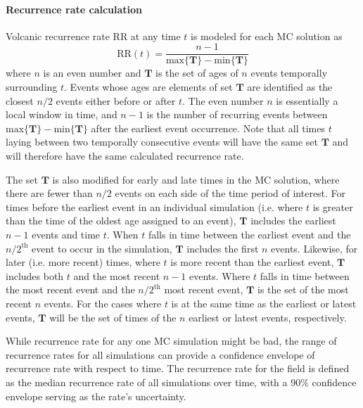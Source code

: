 \paragraph{Recurrence rate calculation} Volcanic recurrence rate RR at any time $t$ is modeled for each MC solution as
\begin{equation}
\text{RR}(t) = \frac{n-1}{\text{max}\{\mathbf{T}\} - \text{min}\{\mathbf{T}\}}
\label{eq_RR}
\end{equation}
where $n$ is an even number and $\mathbf{T}$ is the set of ages of $n$ events temporally surrounding $t$. Events whose ages are elements of set $\mathbf{T}$ are identified as the closest $n/2$ events either before or after $t$. The even number $n$ is essentially a local window in time, and $n-1$ is the number of recurring events between $\text{max}\{\mathbf{T}\}-\text{min}\{\mathbf{T}\}$ after the earliest event occurrence. Note that all times $t$ laying between two temporally consecutive events will have the same set $\mathbf{T}$ and will therefore have the same calculated recurrence rate.

The set $\mathbf{T}$ is also modified for early and late times in the MC solution, where there are fewer than $n/2$ events on each side of the time period of interest. For times before the earliest event in an individual simulation (i.e. where $t$ is greater than the time of the oldest age assigned to an event), $\mathbf{T}$ includes the earliest $n-1$ events and time $t$. When $t$ falls in time between the earliest event and the $n/2^{\text{th}}$ event to occur in the simulation, $\mathbf{T}$ includes the first $n$ events. Likewise, for later (i.e. more recent) times, where $t$ is more recent than the earliest event, $\mathbf{T}$ includes both $t$ and the most recent $n-1$ events. Where $t$ falls in time between the most recent event and the $n/2^{\text{th}}$ most recent event, $\mathbf{T}$ is the set of the most recent $n$ events. For the cases where $t$ is at the same time as the earliest or latest events, $\mathbf{T}$ will be the set of times of the $n$ earliest or latest events, respectively.

While recurrence rate for any one MC simulation might be bad, the range of recurrence rates for all simulations can provide a confidence envelope of recurrence rate with respect to time. The recurrence rate for the field is defined as the median recurrence rate of all simulations over time, with a 90\% confidence envelope serving as the rate's uncertainty.


